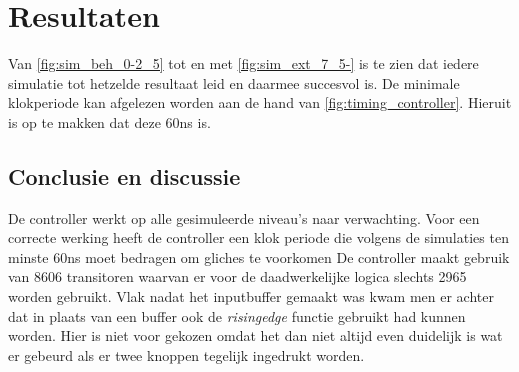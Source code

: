 \section{Resultaten}
Van \cref{fig:sim_beh_0-2_5} tot en met \cref{fig:sim_ext_7_5-} is te zien dat iedere simulatie tot hetzelde resultaat leid en daarmee succesvol is.
De minimale klokperiode kan afgelezen worden aan de hand van \cref{fig:timing_controller}. Hieruit is op te makken dat deze 60ns is.
\subsection{Conclusie en discussie}
De controller werkt op alle gesimuleerde niveau's naar verwachting. Voor een correcte werking heeft de controller een klok periode die volgens de simulaties ten minste 60ns moet bedragen om gliches te voorkomen
De controller maakt gebruik van 8606 transitoren waarvan er voor de daadwerkelijke logica slechts 2965 worden gebruikt. Vlak nadat het inputbuffer gemaakt was kwam men er achter dat in plaats van een buffer ook de \emph{rising\textunderscore edge} functie gebruikt had kunnen worden. Hier is niet voor gekozen omdat het dan niet altijd even duidelijk is wat er gebeurd als er twee knoppen tegelijk ingedrukt worden.

